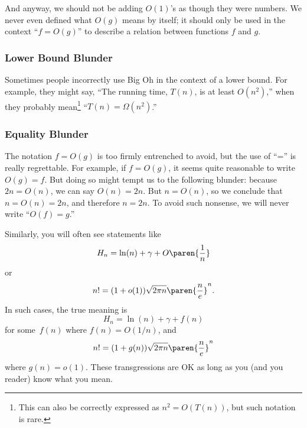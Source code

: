 And anyway, we should not be adding $O(1)$'s as though they were numbers.
We never even defined what $O(g)$ means by itself; it should only be used
in the context ``$f = O(g)$'' to describe a relation between functions $f$
and $g$.

\subsubsection{Lower Bound Blunder}

Sometimes people incorrectly use Big Oh in the context of a lower
bound.  For example, they might say, ``The running time, $T(n)$, is at
least $O(n^2)$,'' when they probably mean\footnote{This can also be
  correctly expressed as $n^2 = O(T(n))$, but such notation is rare.}
``$T(n) = \Omega(n^2)$.''

\subsubsection{Equality Blunder}

The notation $f = O(g)$ is too firmly entrenched to avoid, but the use of
``='' is really regrettable.  For example, if $f = O(g)$, it seems quite
reasonable to write $O(g) = f$.  But doing so might tempt us to the
following blunder: because $2n = O(n)$, we can say $O(n) = 2n$.  But $n =
O(n)$, so we conclude that $n = O(n) = 2n$, and therefore $n = 2n$.  To
avoid such nonsense, we will never write ``$O(f) = g$.''

Similarly, you will often see statements like
\begin{equation*}
    H_n = \ln(n) + \gamma + O\paren{\frac{1}{n}}
\end{equation*}
or
\begin{equation*}
    n! = (1 + o(1)) \sqrt{2\pi n} \paren{\frac{n}{e}}^n.
\end{equation*}
In such cases, the true meaning is
\begin{equation*}
    H_n = \ln(n) + \gamma + f(n)
\end{equation*}
for some~$f(n)$ where $f(n) = O(1/n)$, and
\begin{equation*}
    n! = (1 + g(n)) \sqrt{2\pi n} \paren{\frac{n}{e}}^n
\end{equation*}
where $g(n) = o(1)$.  These transgressions are OK as long as you (and
you reader) know what you mean.

\problemsection

\begin{problems}
\practiceproblems
{}

\homeworkproblems
{}

\classproblems
{}
\end{problems}

\endinput
